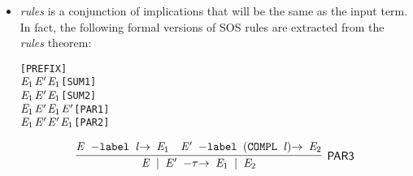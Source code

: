 \begin{itemize}
  \item \emph{rules} is a conjunction of implications that will be the
    same as the input term. In fact, the following formal versions of SOS rules are
    extracted from the \emph{rules} theorem:
\begin{alltt}
\HOLTokenTurnstile{} \HOLSymConst{\ensuremath{\ldotp}} \HOLTokenTransBegin{}\HOLTokenTransEnd {}\hfill\texttt{[PREFIX]}
\HOLTokenTurnstile{}  \HOLTokenTransBegin{}\HOLTokenTransEnd \ensuremath{\HOLFreeVar{E}\sb{\mathrm{1}}} \HOLSymConst{\HOLTokenImp{}}  \HOLSymConst{\ensuremath{+}} \ensuremath{\HOLFreeVar{E}\sp{\prime}} \HOLTokenTransBegin{}\HOLTokenTransEnd \ensuremath{\HOLFreeVar{E}\sb{\mathrm{1}}}\hfill\texttt{[SUM1]}
\HOLTokenTurnstile{}  \HOLTokenTransBegin{}\HOLTokenTransEnd \ensuremath{\HOLFreeVar{E}\sb{\mathrm{1}}} \HOLSymConst{\HOLTokenImp{}} \ensuremath{\HOLFreeVar{E}\sp{\prime}} \HOLSymConst{\ensuremath{+}}  \HOLTokenTransBegin{}\HOLTokenTransEnd \ensuremath{\HOLFreeVar{E}\sb{\mathrm{1}}}\hfill\texttt{[SUM2]}
\HOLTokenTurnstile{}  \HOLTokenTransBegin{}\HOLTokenTransEnd \ensuremath{\HOLFreeVar{E}\sb{\mathrm{1}}} \HOLSymConst{\HOLTokenImp{}}  \HOLSymConst{\ensuremath{\mid}} \ensuremath{\HOLFreeVar{E}\sp{\prime}} \HOLTokenTransBegin{}\HOLTokenTransEnd \ensuremath{\HOLFreeVar{E}\sb{\mathrm{1}}} \HOLSymConst{\ensuremath{\mid}} \ensuremath{\HOLFreeVar{E}\sp{\prime}}\hfill\texttt{[PAR1]}
\HOLTokenTurnstile{}  \HOLTokenTransBegin{}\HOLTokenTransEnd \ensuremath{\HOLFreeVar{E}\sb{\mathrm{1}}} \HOLSymConst{\HOLTokenImp{}} \ensuremath{\HOLFreeVar{E}\sp{\prime}} \HOLSymConst{\ensuremath{\mid}}  \HOLTokenTransBegin{}\HOLTokenTransEnd \ensuremath{\HOLFreeVar{E}\sp{\prime}} \HOLSymConst{\ensuremath{\mid}} \ensuremath{\HOLFreeVar{E}\sb{\mathrm{1}}}\hfill\texttt{[PAR2]}
\end{alltt}
\begin{equation*}
\infer[\HOLRuleName{PAR3}]{\HOLinline{\HOLFreeVar{E} \HOLSymConst{\ensuremath{\mid}} \ensuremath{\HOLFreeVar{E}\sp{\prime}} \HOLTokenTransBegin\HOLSymConst{\ensuremath{\tau}}\HOLTokenTransEnd \ensuremath{\HOLFreeVar{E}\sb{\mathrm{1}}} \HOLSymConst{\ensuremath{\mid}} \ensuremath{\HOLFreeVar{E}\sb{\mathrm{2}}}}}{\HOLinline{\HOLFreeVar{E} \HOLTokenTransBegin\HOLConst{label} \HOLFreeVar{l}\HOLTokenTransEnd \ensuremath{\HOLFreeVar{E}\sb{\mathrm{1}}}}&\HOLinline{\ensuremath{\HOLFreeVar{E}\sp{\prime}} \HOLTokenTransBegin\HOLConst{label} \ensuremath{(}\HOLConst{COMPL} \HOLFreeVar{l}\ensuremath{)}\HOLTokenTransEnd \ensuremath{\HOLFreeVar{E}\sb{\mathrm{2}}}}}

\end{equation*}
\end{itemize}
